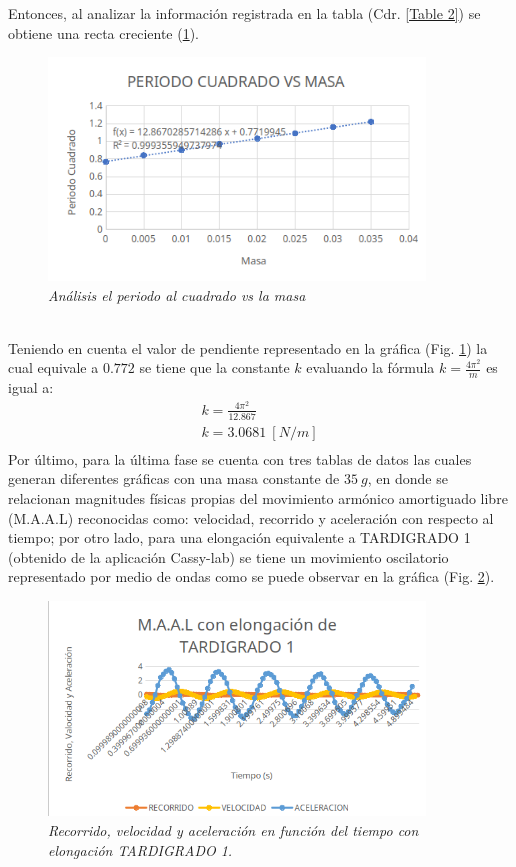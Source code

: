\documentclass[spanish,notitlepage,letterpaper, 12pt]{article}
\begin{document}
Entonces, al analizar la información registrada en la tabla (Cdr. \ref{Table 2}) se obtiene una recta creciente (\ref{Figura 3}).
\begin{figure}[ht]
    \centering
    \includegraphics[width=10.0cm]{images/periodo-cuadrado-vs-masa.png}
    \caption{\textit{Análisis el periodo al cuadrado vs la masa}}
    \label{Figura 3}
\end{figure}
\\
Teniendo en cuenta el valor de pendiente representado en la gráfica (Fig. \ref{Figura 3}) la cual equivale a $0.772$ se tiene que la constante $k$ evaluando la fórmula $k=\frac{4\pi^2}{m}$ es igual a:
\begin{align*}
    k=\frac{4\pi^2}{12.867}\\
    k=3.0681 \ [N/m]\\
\end{align*}
Por último, para la última fase se cuenta con tres tablas de datos las cuales generan diferentes gráficas con una masa constante de $35 \ g$, en donde se relacionan magnitudes físicas propias del movimiento armónico amortiguado libre (M.A.A.L) reconocidas como: velocidad, recorrido y aceleración con
respecto al tiempo; por otro lado, para una elongación equivalente a TARDIGRADO 1 (obtenido de la aplicación Cassy-lab) se tiene un movimiento oscilatorio representado por medio de ondas como se puede observar en la gráfica (Fig. \ref{Figura 4}).
\begin{figure}[ht]
    \centering
    \includegraphics[width=10.0cm]{images/tardigrado1.png}
    \caption{\textit{Recorrido, velocidad y aceleración en función del tiempo con elongación TARDIGRADO 1.}}
    \label{Figura 4}
\end{figure}
\end{document}
